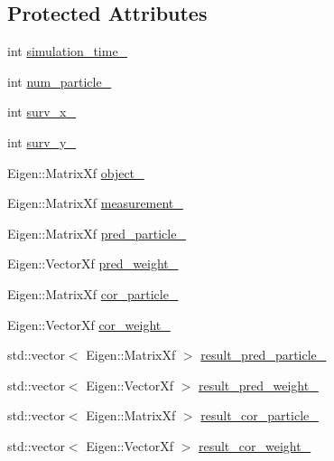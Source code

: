\subsection*{Protected Attributes}
\begin{DoxyCompactItemize}
\item 
int \mbox{\hyperlink{classbfl_1_1SIS_a37062438b43e40eeaa631d17052e6c15}{simulation\+\_\+time\+\_\+}}
\item 
int \mbox{\hyperlink{classbfl_1_1SIS_a7daac4c6a2e6412d8498fda361074740}{num\+\_\+particle\+\_\+}}
\item 
int \mbox{\hyperlink{classbfl_1_1SIS_a162ac45707d6039272c1aa7b4827f274}{surv\+\_\+x\+\_\+}}
\item 
int \mbox{\hyperlink{classbfl_1_1SIS_af39569c2ba7035387556e8a31ca633e8}{surv\+\_\+y\+\_\+}}
\item 
Eigen\+::\+Matrix\+Xf \mbox{\hyperlink{classbfl_1_1SIS_a05ad3f95a4402f875aa2cf98c20f0ac6}{object\+\_\+}}
\item 
Eigen\+::\+Matrix\+Xf \mbox{\hyperlink{classbfl_1_1SIS_aed940f18871c4b12b70bf720bc671184}{measurement\+\_\+}}
\item 
Eigen\+::\+Matrix\+Xf \mbox{\hyperlink{classbfl_1_1SIS_a489ce9127eff33afdecab341774662dd}{pred\+\_\+particle\+\_\+}}
\item 
Eigen\+::\+Vector\+Xf \mbox{\hyperlink{classbfl_1_1SIS_a736b0b1a524f96273201f82d153f55d2}{pred\+\_\+weight\+\_\+}}
\item 
Eigen\+::\+Matrix\+Xf \mbox{\hyperlink{classbfl_1_1SIS_aa4d63e8986156c13cc721c9c94c983d6}{cor\+\_\+particle\+\_\+}}
\item 
Eigen\+::\+Vector\+Xf \mbox{\hyperlink{classbfl_1_1SIS_a3e39c33d92371409b992fb4b856d48c0}{cor\+\_\+weight\+\_\+}}
\item 
std\+::vector$<$ Eigen\+::\+Matrix\+Xf $>$ \mbox{\hyperlink{classbfl_1_1SIS_a153d27bbf73332c052085d286455e435}{result\+\_\+pred\+\_\+particle\+\_\+}}
\item 
std\+::vector$<$ Eigen\+::\+Vector\+Xf $>$ \mbox{\hyperlink{classbfl_1_1SIS_a9af5a5fc5ee16acb826093a1acc7330d}{result\+\_\+pred\+\_\+weight\+\_\+}}
\item 
std\+::vector$<$ Eigen\+::\+Matrix\+Xf $>$ \mbox{\hyperlink{classbfl_1_1SIS_ad1a6248ef476eac5f624780676e96a15}{result\+\_\+cor\+\_\+particle\+\_\+}}
\item 
std\+::vector$<$ Eigen\+::\+Vector\+Xf $>$ \mbox{\hyperlink{classbfl_1_1SIS_a41ae49a78766ccbb0356ff2cdc2fe7ee}{result\+\_\+cor\+\_\+weight\+\_\+}}
\item 

\end{DoxyCompactItemize}
